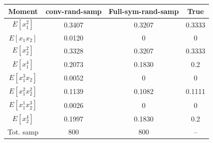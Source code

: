 \documentclass{beamer}
\begin{document}
\begin{frame}
\begin{columns}[c]
   
   \begin{table}
\begin{center}
\tiny
\begin{tabular}{|c|c|c|c|}
\hline
Moment    			&  conv-rand-samp  & Full-sym-rand-samp 	&True  \\
\hline
$E[x_1^2]$   	  &  0.3407 				 & 0.3207    						&  0.3333   \\
\hline
$E[x_1x_2]$ 	  & 0.0120  				 &  0 									&  0  \\
\hline 
$E[x_2^2]$  		& 0.3328 					 & 0.3207  							&  0.3333 \\
\hline
$E[x_1^4]$  		&  0.2073 				 & 0.1830  							&  0.2 \\
\hline
$E[x_1^3x_2] $  & 0.0052  				 & 0   									& 0 \\
\hline
$E[x_1^2x_2^2]$ & 0.1139  			   & 0.1082   						& 0.1111 \\
\hline
$E[x_1^1x_2^3]$ & 0.0026  				 & 0   									& 0 \\
\hline
$E[x_2^4]$ 		  & 0.1997  				 &0.1830  						  & 0.2 \\
\hline
Tot. samp 		  & 800 				 &800  						  & -- \\
\hline
\end{tabular}
\end{center}
\end{table}
   \end{columns}
\end{frame}
\end{document}
